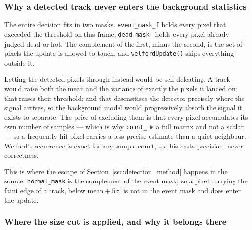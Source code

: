 \documentclass[a4paper,headsepline,oneside,11pt]{scrartcl}
\begin{document}
\subsubsection{Why a detected track never enters the background statistics}
\label{sec:excerpt_background}

\noindent\begin{minipage}[t]{\linewidth}

\end{minipage}

The entire decision fits in two masks. \texttt{event\_mask\_f} holds every pixel
that exceeded the threshold on this frame; \texttt{dead\_mask\_} holds every
pixel already judged dead or hot. The complement of the first, minus the second,
is the set of pixels the update is allowed to touch, and \texttt{welfordUpdate()}
skips everything outside it.

Letting the detected pixels through instead would be self-defeating. A track
would raise both the mean and the variance of exactly the pixels it landed on;
that raises their threshold; and that desensitises the detector precisely where
the signal arrives, so the background model would progressively absorb the
signal it exists to separate. The price of excluding them is that every pixel accumulates its own number of
samples --- which is why \texttt{count\_} is a full matrix and not a scalar --- so
a frequently hit pixel carries a less precise estimate than a quiet neighbour.
Welford's recurrence is exact for any sample count, so this costs precision,
never correctness.

This is where the escape of Section~\ref{sec:detection_method} happens in the
source: \texttt{normal\_mask} is the complement of the event mask, so a pixel
carrying the faint edge of a track, below $\text{mean} + 5\sigma$, is not in the
event mask and does enter the update.

\subsubsection{Where the size cut is applied, and why it belongs there}

\noindent\begin{minipage}[t]{\linewidth}

\end{minipage}
\end{document}
